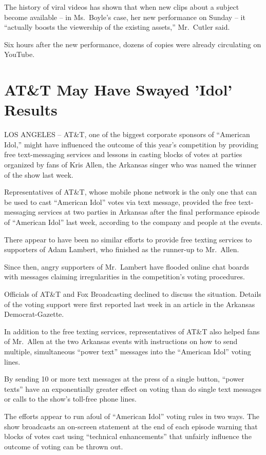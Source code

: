 \documentclass[12pt,a4paper,onecolumn]{article}
\begin{document}
The history of viral videos has shown that when new clips about a subject become available -- in
Ms.~Boyle's case, her new performance on Sunday -- it ``actually boosts the viewership of the
existing assets,'' Mr.~Cutler said.

Six hours after the new performance, dozens of copies were already circulating on YouTube.

\section{AT\&T May Have Swayed 'Idol' Results}

LOS ANGELES -- AT\&T, one of the biggest corporate sponsors of ``American Idol,'' might have
influenced the outcome of this year's competition by providing free text-messaging services and
lessons in casting blocks of votes at parties organized by fans of Kris Allen, the Arkansas singer
who was named the winner of the show last week.

Representatives of AT\&T, whose mobile phone network is the only one that can be used to cast
``American Idol'' votes via text message, provided the free text-messaging services at two parties
in Arkansas after the final performance episode of ``American Idol'' last week, according to the
company and people at the events.

There appear to have been no similar efforts to provide free texting services to supporters of Adam
Lambert, who finished as the runner-up to Mr.~Allen.

Since then, angry supporters of Mr.~Lambert have flooded online chat boards with messages claiming
irregularities in the competition's voting procedures.

Officials of AT\&T and Fox Broadcasting declined to discuss the situation. Details of the voting
support were first reported last week in an article in the Arkansas Democrat-Gazette.

In addition to the free texting services, representatives of AT\&T also helped fans of Mr.~Allen at
the two Arkansas events with instructions on how to send multiple, simultaneous ``power text''
messages into the ``American Idol'' voting lines.

By sending 10 or more text messages at the press of a single button, ``power texts'' have an
exponentially greater effect on voting than do single text messages or calls to the show's toll-free
phone lines.

The efforts appear to run afoul of ``American Idol'' voting rules in two ways. The show broadcasts
an on-screen statement at the end of each episode warning that blocks of votes cast using
``technical enhancements'' that unfairly influence the outcome of voting can be thrown out.
\end{document}
